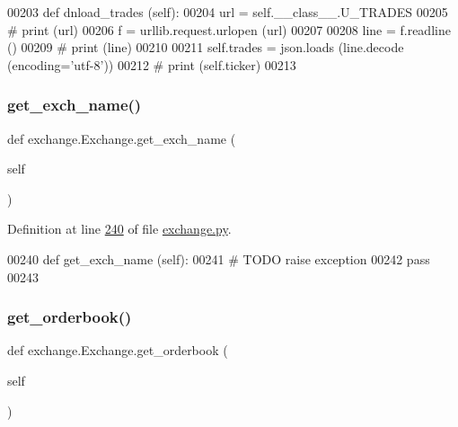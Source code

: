 \begin{DoxyCode}
00203     \textcolor{keyword}{def }dnload\_trades (self):
00204         url = self.\_\_class\_\_.U\_TRADES
00205 \textcolor{comment}{#        print (url)}
00206         f = urllib.request.urlopen (url)
00207         
00208         line = f.readline ()
00209 \textcolor{comment}{#        print (line)}
00210         
00211         self.trades = json.loads (line.decode (encoding=\textcolor{stringliteral}{'utf-8'}))
00212 \textcolor{comment}{#        print (self.ticker)}
00213         
\end{DoxyCode}
\mbox{\label{classexchange_1_1_exchange_a8f095bac98d7ad212f93bfcdff458bf7}} 
\subsubsection{\texorpdfstring{get\+\_\+exch\+\_\+name()}{get\_exch\_name()}}
{\footnotesize\ttfamily def exchange.\+Exchange.\+get\+\_\+exch\+\_\+name (\begin{DoxyParamCaption}\item[{}]{self }\end{DoxyParamCaption})}



Definition at line \hyperlink{exchange_8py_source_l00240}{240} of file \hyperlink{exchange_8py_source}{exchange.\+py}.


\begin{DoxyCode}
00240     \textcolor{keyword}{def }get\_exch\_name (self):
00241         \textcolor{comment}{# TODO raise exception}
00242         \textcolor{keywordflow}{pass}
00243     
\end{DoxyCode}
\mbox{\label{classexchange_1_1_exchange_a5d0c05c289d664892ade5edb03adbd6b}} 
\subsubsection{\texorpdfstring{get\+\_\+orderbook()}{get\_orderbook()}}
{\footnotesize\ttfamily def exchange.\+Exchange.\+get\+\_\+orderbook (\begin{DoxyParamCaption}\item[{}]{self }\end{DoxyParamCaption})}




